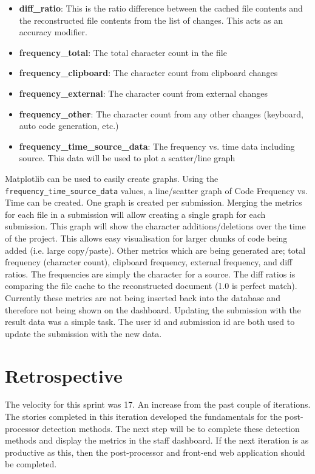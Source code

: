 \begin{itemize}
\item \textbf{diff\_ratio}: This is the ratio difference between the cached file contents and the reconstructed file contents from the list of changes. This acts as an accuracy modifier.
\item \textbf{frequency\_total}: The total character count in the file
\item \textbf{frequency\_clipboard}: The character count from clipboard changes
\item \textbf{frequency\_external}: The character count from external changes
\item \textbf{frequency\_other}: The character count from any other changes (keyboard, auto code generation, etc.)
\item \textbf{frequency\_time\_source\_data}: The frequency vs. time data including source. This data will be used to plot a scatter/line graph
\end{itemize}

Matplotlib can be used to easily create graphs. Using the \texttt{frequency\_time\_source\_data} values, a line/scatter graph of Code Frequency vs. Time can be created. One graph is created per submission. Merging the metrics for each file in a submission will allow creating a single graph for each submission. This graph will show the character additions/deletions over the time of the project. This allows easy visualisation for larger chunks of code being added (i.e. large copy/paste). Other metrics which are being generated are; total frequency (character count), clipboard frequency, external frequency, and diff ratios. The frequencies are simply the character for a source. The diff ratios is comparing the file cache to the reconstructed document (1.0 is perfect match). Currently these metrics are not being inserted back into the database and therefore not being shown on the dashboard. Updating the submission with the result data was a simple task. The user id and submission id are both used to update the submission with the new data.

\section{Retrospective}
The velocity for this sprint was 17. An increase from the past couple of iterations. The stories completed in this iteration developed the fundamentals for the post-processor detection methods. The next step will be to complete these detection methods and display the metrics in the staff dashboard. If the next iteration is as productive as this, then the post-processor and front-end web application should be completed.
